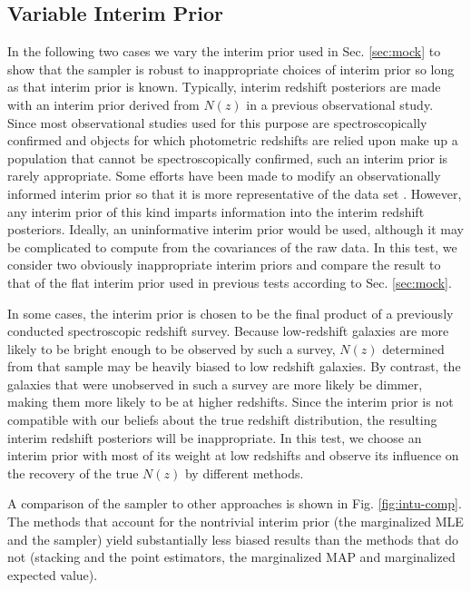 \documentclass[preprint]{aastex}
\begin{document}
\clearpage
\subsection{Variable Interim Prior}
\label{sec:interim}

In the following two cases we vary the interim prior used in Sec. 
\ref{sec:mock} to show that the sampler is robust to inappropriate choices of 
interim prior so long as that interim prior is known.  Typically, interim 
redshift posteriors are made with an interim prior derived from $N(z)$ in a 
previous observational study.  Since most observational studies used for this 
purpose are spectroscopically confirmed and objects for which photometric 
redshifts are relied upon make up a population that cannot be spectroscopically 
confirmed, such an interim prior is rarely appropriate.  Some efforts have been 
made to modify an observationally informed interim prior so that it is more 
representative of the data set \citep{Sheldon2012}.  However, any interim prior 
of this kind imparts information into the interim redshift posteriors.  
Ideally, an uninformative interim prior would be used, although it may be 
complicated to compute from the covariances of the raw data.  In this test, we 
consider two obviously inappropriate interim priors and compare the result to 
that of the flat interim prior used in previous tests according to Sec. 
\ref{sec:mock}.

In some cases, the interim prior is chosen to be the final product of a 
previously conducted spectroscopic redshift survey.  Because low-redshift 
galaxies are more likely to be bright enough to be observed by such a survey, 
$N(z)$ determined from that sample may be heavily biased to low redshift 
galaxies.  By contrast, the galaxies that were unobserved in such a survey are 
more likely be dimmer, making them more likely to be at higher redshifts.  
Since the interim prior is not compatible with our beliefs about the true 
redshift distribution, the resulting interim redshift posteriors will be 
inappropriate.  In this test, we choose an interim prior with most of its 
weight at low redshifts and observe its influence on the recovery of the true 
$N(z)$ by different methods.  

A comparison of the sampler to other approaches is shown in Fig. 
\ref{fig:intu-comp}.  The methods that account for the nontrivial interim prior 
(the marginalized MLE and the sampler) yield substantially less biased results 
than the methods that do not (stacking and the point estimators, the 
marginalized MAP and marginalized expected value).
\end{document}

